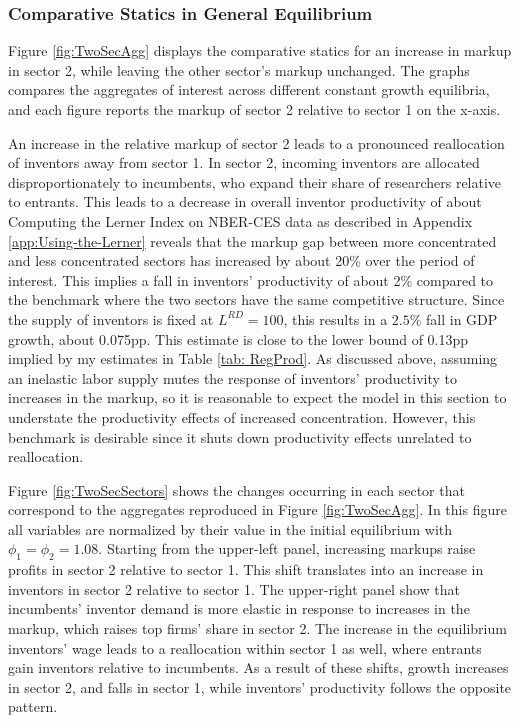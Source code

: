\subsubsection{Comparative Statics in General Equilibrium}

Figure \ref{fig:TwoSecAgg} displays the comparative statics for an
increase in markup in sector 2, while leaving the other sector's markup
unchanged. The graphs compares the aggregates of interest across different
constant growth equilibria, and each figure reports the markup of
sector 2 relative to sector 1 on the x-axis. 

An increase in the relative markup of sector 2 leads to a pronounced
reallocation of inventors away from sector 1. In sector 2, incoming
inventors are allocated disproportionately to incumbents, who expand
their share of researchers relative to entrants. This leads to a decrease
in overall inventor productivity of about Computing the Lerner Index
on NBER-CES data as described in Appendix \ref{app:Using-the-Lerner}
reveals that the markup gap between more concentrated and less concentrated
sectors has increased by about 20\% over the period of interest. This
implies a fall in inventors' productivity of about 2\% compared to
the benchmark where the two sectors have the same competitive structure.
Since the supply of inventors is fixed at $L^{RD}=100$, this results
in a $2.5\%$ fall in GDP growth, about 0.075pp. This estimate is
close to the lower bound of 0.13pp implied by my estimates in Table
\ref{tab: RegProd}. As discussed above, assuming an inelastic labor
supply mutes the response of inventors' productivity to increases
in the markup, so it is reasonable to expect the model in this section
to understate the productivity effects of increased concentration.
However, this benchmark is desirable since it shuts down productivity
effects unrelated to reallocation.

Figure \ref{fig:TwoSecSectors} shows the changes occurring in each
sector that correspond to the aggregates reproduced in Figure \ref{fig:TwoSecAgg}.
In this figure all variables are normalized by their value in the
initial equilibrium with $\phi_{1}=\phi_{2}=1.08.$ Starting from
the upper-left panel, increasing markups raise profits in sector 2
relative to sector 1. This shift translates into an increase in inventors
in sector 2 relative to sector 1. The upper-right panel show that
incumbents' inventor demand is more elastic in response to increases
in the markup, which raises top firms' share in sector 2. The increase
in the equilibrium inventors' wage leads to a reallocation within
sector 1 as well, where entrants gain inventors relative to incumbents.
As a result of these shifts, growth increases in sector 2, and falls
in sector 1, while inventors' productivity follows the opposite pattern.

